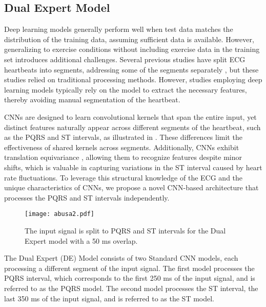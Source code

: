 \subsection{Dual Expert Model}

Deep learning models generally perform well when test data matches the distribution of the training data, assuming sufficient data is available.
However, generalizing to exercise conditions without including exercise data in the training set introduces additional challenges.
Several previous studies have split ECG heartbeats into segments, addressing some of the segments separately \cite{Chun2016, Saechia}, but these studies relied on traditional processing methods. 
However, studies employing deep learning models typically rely on the model to extract the necessary features, thereby avoiding manual segmentation of the heartbeat.

CNNs are designed to learn convolutional kernels that span the entire input, yet distinct features naturally appear across different segments of the heartbeat, such as the PQRS and ST intervals, as illustrated in . These differences limit the effectiveness of shared kernels across segments. Additionally, CNNs exhibit translation equivariance \cite{app10093161}, allowing them to recognize features despite minor shifts, which is valuable in capturing variations in the ST interval caused by heart rate fluctuations.
To leverage this structural knowledge of the ECG and the unique characteristics of CNNs, we propose a novel CNN-based architecture that processes the PQRS and ST intervals independently.

\begin{figure}[!t]
\centerline{\texttt{[image: abusa2.pdf]}}
\caption[PQRS and ST intervals split for DE model]{The input signal is split to PQRS and ST intervals for the Dual Expert model with a 50 ms overlap.}
\label{fig:pqrs_st}
\end{figure}

The Dual Expert (DE) Model consists of two Standard CNN models, each processing a different segment of the input signal. The first model processes the PQRS interval, which corresponds to the first 250 ms of the input signal, and is referred to as the PQRS model. The second model processes the ST interval, the last 350 ms of the input signal, and is referred to as the ST model.

